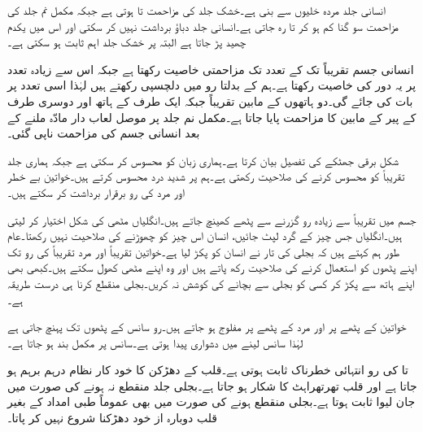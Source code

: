 انسانی جلد مردہ خلیوں سے بنی ہے۔خشک جلد کی مزاحمت  تا  ہوتی ہے جبکہ مکمل نم جلد کی مزاحمت سو گنا کم ہو کر  تا  رہ جاتی ہے۔انسانی جلد  دباؤ برداشت نہیں کر سکتی اور اس میں یکدم چھید پڑ جاتا ہے البتہ   پر خشک جلد اہم ثابت ہو سکتی ہے۔

انسانی جسم تقریباً  تک کے تعدد تک مزاحمتی خاصیت رکھتا ہے جبکہ اس سے زیادہ تعدد پر یہ  دور کی خاصیت رکھتا ہے۔ہم  کے بدلتا رو میں دلچسپی رکھتے ہیں لہٰذا اسی تعدد پر بات کی جائے گی۔دو ہاتھوں کے مابین تقریباً  جبکہ ایک طرف کے ہاتھ اور دوسری طرف کے پیر کے مابین  کا مزاحمت پایا جاتا ہے۔مکمل نم جلد پر موصل لعاب دار مادّہ ملنے کے بعد انسانی جسم کی مزاحمت ناپی گئی۔  

شکل  برقی جھٹکے کی تفصیل بیان کرتا ہے۔ہماری زبان  کو محسوس کر سکتی ہے جبکہ ہماری جلد تقریباً  کو محسوس کرنے کی صلاحیت رکھتی ہے۔ہم  پر شدید درد محسوس کرتے ہیں۔خواتین بے خطر   اور مرد  کی رو برقرار برداشت کر سکتے ہیں۔

جسم میں تقریباً  سے زیادہ رو گزرنے سے پٹھے کھینچ جاتے ہیں۔انگلیاں مٹھی  کی شکل اختیار کر لیتی ہیں۔انگلیاں جس چیز کے گرد لپٹ جائیں، انسان اس چیز کو چھوڑنے کی صلاحیت نہیں رکھتا۔عام طور ہم کہتے ہیں کہ بجلی کی تار نے انسان کو پکڑ لیا ہے۔خواتین تقریباً  اور مرد تقریباً  کی رو تک اپنے پٹھوں کو استعمال کرنے کی صلاحیت رکھ پاتے ہیں اور وہ اپنے مٹھی کھول سکتے ہیں۔کبھی بھی اپنے  ہاتھ سے پکڑ کر کسی کو بجلی سے بچانے کی کوشش نہ کریں۔بجلی منقطع کرنا ہی درست طریقہ ہے۔

خواتین کے پٹھے  پر اور مرد کے پٹھے  پر مفلوج ہو جاتے ہیں۔رو سانس کے پٹھوں تک پہنچ جاتی ہے لہٰذا سانس لینے میں دشواری پیدا ہوتی ہے۔سانس  پر مکمل بند ہو جاتا ہے۔

 تا  کی رو انتہائی خطرناک ثابت ہوتی ہے۔قلب کے دھڑکن کا خود کار نظام درہم برہم ہو جاتا ہے اور قلب تھرتھراہٹ کا شکار ہو جاتا ہے۔بجلی جلد منقطع نہ ہونے کی صورت میں جان لیوا ثابت ہوتا ہے۔بجلی منقطع ہونے کی صورت میں بھی عموماً طبی امداد کے بغیر قلب دوبارہ از خود دھڑکنا شروع نہیں کر پاتا۔

